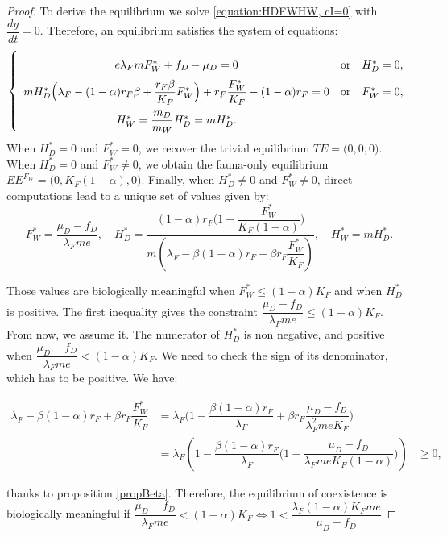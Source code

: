 \documentclass{article}
\newcommand{\lfw}{\lambda_{F}}
\newcommand{\lfw}{\lambda_{F}}
\begin{document}
\begin{proof}
To derive the equilibrium we solve \eqref{equation:HDFWHW, cI=0} with $\dfrac{d y}{dt} = 0$. Therefore, an equilibrium satisfies the system of equations:
\begin{equation}\label{system-equilibre, cI=0}
\def\arraystretch{2}
\left\lbrace \begin{array}{cll}
 e \lfw m F_W^* + f_D - \mu_D = 0& \mbox{or} & H_D^* = 0,\\
m H_D^*\Big(\lfw - (1-\alpha)r_F \beta + \dfrac{r_F \beta}{K_F}F_W^* \Big) + r_F \dfrac{F_W^*}{K_F} - (1-\alpha)r_F= 0& \mbox{or} & F^*_W = 0,\\
H_W^* = \dfrac{m_D}{m_W} H_D^* = m H_D^*.&&
\end{array} \right.
\end{equation}
When $H_D^*=0$ and $F_W^*=0$, we recover the trivial equilibrium $TE = \Big(0,0,0\Big)$. When $H_D^*=0$ and $F_W^*\neq0$, we obtain the fauna-only equilibrium $EE^{F_W} = \Big(0, K_F(1-\alpha), 0 \Big)$. Finally, when $H_D^*\neq0$ and $F_W^*\neq0$, direct computations lead to a unique set of values given by:
$$F^*_{W} = \dfrac{\mu_D - f_D}{\lfw m e},
\quad 
H^*_{D} = \dfrac{(1-\alpha)r_F\Big(1 - \dfrac{F^*_{W}}{K_F(1-\alpha)} \Big)}{m\left(\lfw - \beta (1-\alpha) r_F + \beta r_F  \dfrac{F^*_{W}}{K_F}\right)} ,
\quad 
H^*_{W} = m H^*_{D}.$$

Those values are biologically meaningful when $F_W^* \leq (1-\alpha) K_F$ and when $H_D^*$ is positive. The first inequality gives the constraint $\dfrac{\mu_D - f_D}{\lfw m e} \leq (1-\alpha)K_F$. From now, we assume it. The numerator of $H^*_{D}$ is non negative, and positive when $\dfrac{\mu_D - f_D}{\lfw m e} < (1-\alpha)K_F$. We need to check the sign of its denominator, which has to be positive. We have:

\begin{align*}
\lfw - \beta (1-\alpha) r_F + \beta r_F  \dfrac{F^*_{W}}{K_F} &= \lfw\Big(1 - \dfrac{\beta (1-\alpha) r_F}{\lfw} + \beta r_F  \dfrac{\mu_D - f_D}{\lfw^2 m e K_F} \Big) \\
&= \lfw\left(1 - \dfrac{\beta (1-\alpha) r_F}{\lfw}\Big(1 -\dfrac{\mu_D - f_D}{\lfw m e K_F(1-\alpha)} \Big) \right)
&\geq 0,
\end{align*}

thanks to proposition \ref{propBeta}. Therefore, the equilibrium of coexistence is biologically meaningful if $\dfrac{\mu_D - f_D}{\lfw m e} < (1-\alpha)K_F \Leftrightarrow 1 < \dfrac{\lfw (1-\alpha)K_F m e}{\mu_D - f_D}$

\end{proof}
\end{document}
